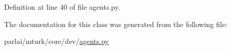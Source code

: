 Definition at line 40 of file agents.\+py.



The documentation for this class was generated from the following file\+:\begin{DoxyCompactItemize}
\item 
parlai/mturk/core/dev/\hyperlink{parlai_2mturk_2core_2dev_2agents_8py}{agents.\+py}\end{DoxyCompactItemize}
